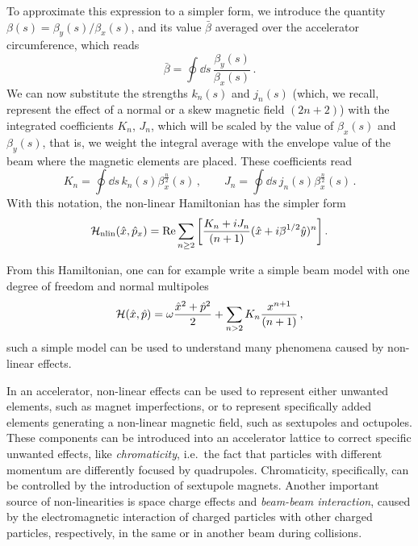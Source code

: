 To approximate this expression to a simpler form, we introduce the quantity $\beta(s)=\beta_y(s)/\beta_x(s)$, and its value $\bar\beta$ averaged over the accelerator circumference, which reads
\begin{equation}
    \bar\beta = \oint \dd s\, \frac{\beta_y(s)}{\beta_x(s)} \,.
\end{equation}
We can now substitute the strengths $k_n(s)$ and $j_n(s)$ (which, we recall, represent the effect of a normal or a skew magnetic field $(2n+2)$) with the integrated coefficients $K_n$, $J_n$, which will be scaled by the value of $\beta_x(s)$ and $\beta_y(s)$, that is, we weight the integral average with the envelope value of the beam where the magnetic elements are placed. These coefficients read
%
\begin{equation} 
	K_n = \oint \dd s\, k_n(s) \beta_x^{\frac{n}{2}}(s)\,,\qquad
	J_n = \oint \dd s\, j_n(s) \beta_x^{\frac{n}{2}}(s)\,.
\end{equation} 
%
With this notation, the non-linear Hamiltonian has the simpler form
% 
\begin{equation} \ham_\text{nlin}(\hat x, \hat p_x) = \Re \sum_{n\ge 2} \qty[\frac{K_n + iJ_n}{(n+1)} (\hat x + i\bar\beta^{1/2} \hat y)^n]\,.\end{equation}

From this Hamiltonian, one can for example write a simple beam model with one degree of freedom and normal multipoles
\begin{equation}
	\mathcal{H}(\hat x,\hat p) = \omega \frac{\hat x^2 + \hat p^2}{2} + \sum_{n>2} K_n \frac{x^{n+1}}{(n+1)}\, ,
	\label{eq:hamxp_nl}
\end{equation}
such a simple model can be used to understand many phenomena caused by non-linear effects.

In an accelerator, non-linear effects can be used to represent either unwanted elements, such as magnet imperfections, or to represent specifically added elements generating a non-linear magnetic field, such as sextupoles and octupoles. These components can be introduced into an accelerator lattice to correct specific unwanted effects, like \textit{chromaticity}, i.e.\ the fact that particles with different momentum are differently focused by quadrupoles. Chromaticity, specifically, can be controlled by the introduction of sextupole magnets. Another important source of non-linearities is space charge effects and \textit{beam-beam interaction}, caused by the electromagnetic interaction of charged particles with other charged particles, respectively, in the same or in another beam during collisions.

